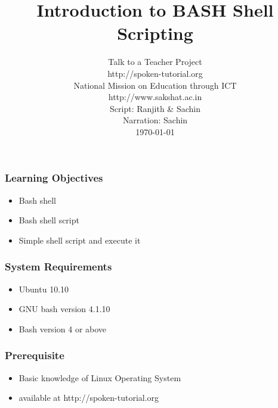 \documentclass[17pt]{beamer}
\begin{document}
\sffamily \bfseries

\title
[BASH Shell Scripting \hspace{1cm}
\insertframenumber/\inserttotalframenumber]
{Introduction to BASH Shell Scripting}
\author
[Script: Ranjith, Sachin  Narration: Sachin]
{{\small Talk to a Teacher Project \\ {\color{blue}
    http://spoken-tutorial.org} \\
National Mission on Education through ICT \\
{\color{blue}http://www.sakshat.ac.in}}\\
{\scriptsize Script:}  \small Ranjith \& Sachin \\ 
{\scriptsize Narration:} \small Sachin\\ 
{\today}}

\begin{frame}
   \titlepage
\end{frame}

\begin{frame}[fragile]
  \frametitle{Learning Objectives}
  \begin{itemize}[<+-|alert@+>]
  \item Bash shell
  \item Bash shell script
  \item Simple shell script and execute it
  \end{itemize}
\end{frame}

\begin{frame}[fragile]
  \frametitle{System Requirements}
  \begin{itemize}[<+-|alert@+>]
  \item Ubuntu 10.10 
  \item GNU bash version 4.1.10  
  \item Bash version 4 or above
  \end{itemize}
\end{frame}

\begin{frame}[fragile]
  \frametitle{Prerequisite}
  \begin{itemize}[<+-|alert@+>]
  \item Basic knowledge of Linux Operating System
  \item available at http://spoken-tutorial.org
  \end{itemize}
\end{frame}
\end{document}
